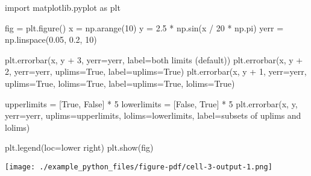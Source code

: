 \documentclass[
  letterpaper,
  DIV=11,
  numbers=noendperiod]{scrreprt}
\newenvironment{Shaded}{\begin{snugshade}}{\end{snugshade}}
\newcommand{\DecValTok}[1]{\textcolor[rgb]{0.68,0.00,0.00}{#1}}
\newcommand{\FloatTok}[1]{\textcolor[rgb]{0.68,0.00,0.00}{#1}}
\newcommand{\ImportTok}[1]{\textcolor[rgb]{0.00,0.48,0.65}{#1}}
\newcommand{\NormalTok}[1]{\textcolor[rgb]{0.00,0.48,0.65}{#1}}
\newcommand{\OperatorTok}[1]{\textcolor[rgb]{0.37,0.37,0.37}{#1}}
\newcommand{\StringTok}[1]{\textcolor[rgb]{0.13,0.47,0.30}{#1}}
\newcommand{\VariableTok}[1]{\textcolor[rgb]{0.07,0.07,0.07}{#1}}
\begin{document}
\begin{Shaded}
\begin{Highlighting}[]
\ImportTok{import}\NormalTok{ matplotlib.pyplot }\ImportTok{as}\NormalTok{ plt}

\NormalTok{fig }\OperatorTok{=}\NormalTok{ plt.figure()}
\NormalTok{x }\OperatorTok{=}\NormalTok{ np.arange(}\DecValTok{10}\NormalTok{)}
\NormalTok{y }\OperatorTok{=} \FloatTok{2.5} \OperatorTok{*}\NormalTok{ np.sin(x }\OperatorTok{/} \DecValTok{20} \OperatorTok{*}\NormalTok{ np.pi)}
\NormalTok{yerr }\OperatorTok{=}\NormalTok{ np.linspace(}\FloatTok{0.05}\NormalTok{, }\FloatTok{0.2}\NormalTok{, }\DecValTok{10}\NormalTok{)}

\NormalTok{plt.errorbar(x, y }\OperatorTok{+} \DecValTok{3}\NormalTok{, yerr}\OperatorTok{=}\NormalTok{yerr, label}\OperatorTok{=}\StringTok{\textquotesingle{}both limits (default)\textquotesingle{}}\NormalTok{)}
\NormalTok{plt.errorbar(x, y }\OperatorTok{+} \DecValTok{2}\NormalTok{, yerr}\OperatorTok{=}\NormalTok{yerr, uplims}\OperatorTok{=}\VariableTok{True}\NormalTok{, label}\OperatorTok{=}\StringTok{\textquotesingle{}uplims=True\textquotesingle{}}\NormalTok{)}
\NormalTok{plt.errorbar(x, y }\OperatorTok{+} \DecValTok{1}\NormalTok{, yerr}\OperatorTok{=}\NormalTok{yerr, uplims}\OperatorTok{=}\VariableTok{True}\NormalTok{, lolims}\OperatorTok{=}\VariableTok{True}\NormalTok{,}
\NormalTok{             label}\OperatorTok{=}\StringTok{\textquotesingle{}uplims=True, lolims=True\textquotesingle{}}\NormalTok{)}

\NormalTok{upperlimits }\OperatorTok{=}\NormalTok{ [}\VariableTok{True}\NormalTok{, }\VariableTok{False}\NormalTok{] }\OperatorTok{*} \DecValTok{5}
\NormalTok{lowerlimits }\OperatorTok{=}\NormalTok{ [}\VariableTok{False}\NormalTok{, }\VariableTok{True}\NormalTok{] }\OperatorTok{*} \DecValTok{5}
\NormalTok{plt.errorbar(x, y, yerr}\OperatorTok{=}\NormalTok{yerr, uplims}\OperatorTok{=}\NormalTok{upperlimits, lolims}\OperatorTok{=}\NormalTok{lowerlimits,}
\NormalTok{             label}\OperatorTok{=}\StringTok{\textquotesingle{}subsets of uplims and lolims\textquotesingle{}}\NormalTok{)}

\NormalTok{plt.legend(loc}\OperatorTok{=}\StringTok{\textquotesingle{}lower right\textquotesingle{}}\NormalTok{)}
\NormalTok{plt.show(fig)}
\end{Highlighting}
\end{Shaded}

\texttt{[image: ./example\_python\_files/figure-pdf/cell-3-output-1.png]}
\end{document}
